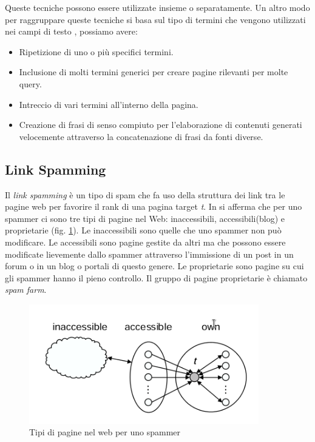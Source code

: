Queste tecniche possono essere utilizzate insieme o separatamente. Un altro modo per raggruppare queste tecniche si basa sul tipo di termini che vengono utilizzati nei campi di testo \cite{ilprints646}, possiamo avere:
\begin{itemize}
\item Ripetizione di uno o più specifici termini.
\item Inclusione di molti termini generici per creare pagine rilevanti per molte query.
\item Intreccio di vari termini all'interno della pagina.
\item Creazione di frasi di senso compiuto per l'elaborazione di contenuti generati velocemente attraverso la concatenazione di frasi da fonti diverse.
\end{itemize}

\subsection{Link Spamming}
Il \textit{link spamming} è un tipo di spam che fa uso della struttura dei link tra le pagine web per favorire il rank di una pagina target \textit{t}.
In \cite{ilprints646} si afferma che per uno spammer ci sono tre tipi di pagine nel Web: inaccessibili, accessibili(blog) e proprietarie (fig. \ref{fig:tipologiaPagine}). Le inaccessibili sono quelle che uno spammer non può modificare. Le accessibili sono pagine gestite da altri ma che possono essere modificate lievemente dallo spammer attraverso l'immissione di un post in un forum o in un blog o portali di questo genere. Le proprietarie sono pagine su cui gli spammer hanno il pieno controllo. Il gruppo di pagine proprietarie è chiamato \textit{spam farm}.
\begin{figure} 
 \centering
 \includegraphics[width=10cm]{immagini/tipologiaPagine}
 \caption{Tipi di pagine nel web per uno spammer}
 \label{fig:tipologiaPagine}
\end{figure}

